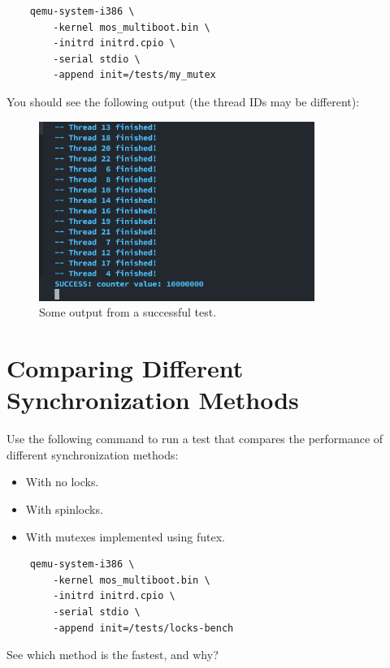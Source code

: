 \begin{verbatim}
    qemu-system-i386 \
        -kernel mos_multiboot.bin \
        -initrd initrd.cpio \
        -serial stdio \
        -append init=/tests/my_mutex
\end{verbatim}

You should see the following output (the thread IDs may be different):

\begin{figure}[h]
    \centering
    \includegraphics[width=0.8\textwidth]{assets/c3.futex-output.png}
    \caption{Some output from a successful test.}
\end{figure}

\section{Comparing Different Synchronization Methods}

Use the following command to run a test that compares the performance of different
synchronization methods:

\begin{itemize}
    \item With no locks.
    \item With spinlocks.
    \item With mutexes implemented using futex.
\end{itemize}

\begin{verbatim}
    qemu-system-i386 \
        -kernel mos_multiboot.bin \
        -initrd initrd.cpio \
        -serial stdio \
        -append init=/tests/locks-bench
\end{verbatim}

See which method is the fastest, and why?
